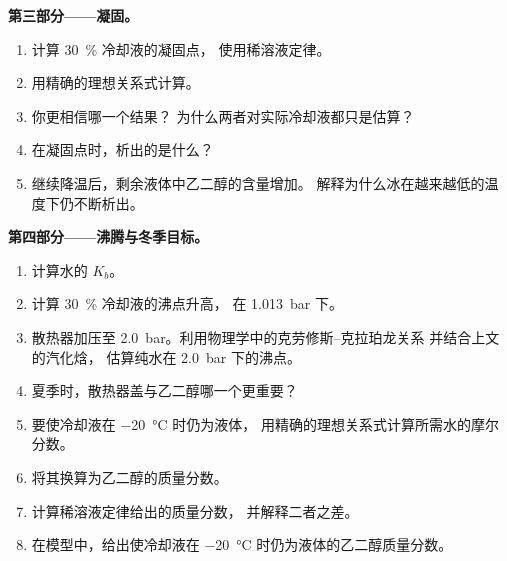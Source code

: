 \begin{problem}
\medskip
\noindent\textbf{第三部分——凝固。}
\begin{enumerate}[resume]
  \item 计算 \qty{30}{\percent} 冷却液的凝固点，
        使用稀溶液定律。
  \item 用精确的理想关系式计算。
  \item 你更相信哪一个结果？
        为什么两者对实际冷却液都只是估算？
  \item 在凝固点时，析出的是什么？
  \item 继续降温后，剩余液体中乙二醇的含量增加。
        解释为什么冰在越来越低的温度下仍不断析出。
\end{enumerate}

\medskip
\noindent\textbf{第四部分——沸腾与冬季目标。}
\begin{enumerate}[resume]
  \item 计算水的 $K_b$。
  \item 计算 \qty{30}{\percent} 冷却液的沸点升高，
        在 \qty{1.013}{bar} 下。
  \item 散热器加压至 \qty{2.0}{bar}。利用物理学中的克劳修斯–克拉珀龙关系
        并结合上文的汽化焓，
        估算纯水在
        \qty{2.0}{bar} 下的沸点。
  \item 夏季时，散热器盖与乙二醇哪一个更重要？
  \item 要使冷却液在 \qty{-20}{\celsius} 时仍为液体，
        用精确的理想关系式计算所需水的摩尔分数。
  \item 将其换算为乙二醇的质量分数。
  \item 计算稀溶液定律给出的质量分数，
        并解释二者之差。
  \item 在模型中，给出使冷却液在
        \qty{-20}{\celsius} 时仍为液体的乙二醇质量分数。
\end{enumerate}
\end{problem}
